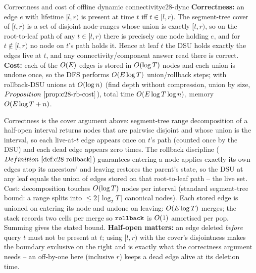 \begin{theorem}{Correctness and cost of offline dynamic connectivity}{c28-dync}
\textbf{Correctness:} an edge \(e\) with lifetime \([l,r)\) is present at time
\(t\) iff \(t\in[l,r)\).  The segment-tree cover of \([l,r)\) is a set of
disjoint node-ranges whose union is exactly \([l,r)\), so on the root-to-leaf
path of any \(t\in[l,r)\) there is precisely one node holding \(e\), and for
\(t\notin[l,r)\) no node on \(t\)'s path holds it.  Hence at leaf \(t\) the DSU
holds exactly the edges live at \(t\), and any connectivity/component answer read
there is correct.  \textbf{Cost:} each of the \(O(E)\) edges is stored in
\(O(\log T)\) nodes and each union is undone once, so the DFS performs
\(O(E\log T)\) union/rollback steps; with rollback-DSU unions at
\(O(\log n)\) (find depth without compression, union by size,
\(\propref{c28-rb-cost}\)), total time \(O(E\log T\log n)\), memory
\(O(E\log T + n)\).
\end{theorem}
\begin{proofbox}
Correctness is the cover argument above: segment-tree range decomposition of a
half-open interval returns nodes that are pairwise disjoint and whose union is
the interval, so each live-at-\(t\) edge appears once on \(t\)'s path (counted
once by the DSU) and each dead edge appears zero times.  The rollback discipline
(\(\defref{c28-rollback}\)) guarantees entering a node applies exactly its own
edges atop its ancestors' and leaving restores the parent's state, so the DSU at
any leaf equals the union of edges stored on that root-to-leaf path -- the live
set.  Cost: decomposition touches \(O(\log T)\) nodes per interval (standard
segment-tree bound: a range splits into \(\le 2\lceil\log_2 T\rceil\) canonical
nodes).  Each stored edge is unioned on entering its node and undone on leaving:
\(O(E\log T)\) merges; the stack records two cells per merge so
\(\texttt{rollback}\) is \(O(1)\) amortised per pop.  Summing gives the
stated bound.  \textbf{Half-open matters:} an edge deleted \emph{before} query
\(t\) must not be present at \(t\); using \([l,r)\) with the cover's disjointness
makes the boundary exclusive on the right and is exactly what the correctness
argument needs -- an off-by-one here (inclusive \(r\)) keeps a dead edge alive
at its deletion time.
\end{proofbox}

